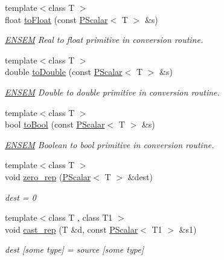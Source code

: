 \begin{DoxyCompactItemize}
{\footnotesize template$<$class T $>$ }\\float \mbox{\hyperlink{group__primscalar_gab273a0c0a29e18b106644d9def35d745}{to\+Float}} (const \mbox{\hyperlink{classENSEM_1_1PScalar}{P\+Scalar}}$<$ T $>$ \&s)
\begin{DoxyCompactList}\small\item\em \mbox{\hyperlink{namespaceENSEM}{E\+N\+S\+EM}} Real to float primitive in conversion routine. \end{DoxyCompactList}\item 
{\footnotesize template$<$class T $>$ }\\double \mbox{\hyperlink{group__primscalar_ga161f37d5fa3cda93eefdd3e606049805}{to\+Double}} (const \mbox{\hyperlink{classENSEM_1_1PScalar}{P\+Scalar}}$<$ T $>$ \&s)
\begin{DoxyCompactList}\small\item\em \mbox{\hyperlink{namespaceENSEM}{E\+N\+S\+EM}} Double to double primitive in conversion routine. \end{DoxyCompactList}\item 
{\footnotesize template$<$class T $>$ }\\bool \mbox{\hyperlink{group__primscalar_ga00261c3d6b58172e9dbb59a8d8518b4d}{to\+Bool}} (const \mbox{\hyperlink{classENSEM_1_1PScalar}{P\+Scalar}}$<$ T $>$ \&s)
\begin{DoxyCompactList}\small\item\em \mbox{\hyperlink{namespaceENSEM}{E\+N\+S\+EM}} Boolean to bool primitive in conversion routine. \end{DoxyCompactList}\item 
{\footnotesize template$<$class T $>$ }\\void \mbox{\hyperlink{group__primscalar_gaf5afd39d3948d69df06ad306b2fdb494}{zero\+\_\+rep}} (\mbox{\hyperlink{classENSEM_1_1PScalar}{P\+Scalar}}$<$ T $>$ \&dest)
\begin{DoxyCompactList}\small\item\em dest = 0 \end{DoxyCompactList}\item 
{\footnotesize template$<$class T , class T1 $>$ }\\void \mbox{\hyperlink{group__primscalar_ga32486e123809d21bcf028ab891ee845a}{cast\+\_\+rep}} (T \&d, const \mbox{\hyperlink{classENSEM_1_1PScalar}{P\+Scalar}}$<$ T1 $>$ \&s1)
\begin{DoxyCompactList}\small\item\em dest \mbox{[}some type\mbox{]} = source \mbox{[}some type\mbox{]} \end{DoxyCompactList}\item 

\end{DoxyCompactItemize}
